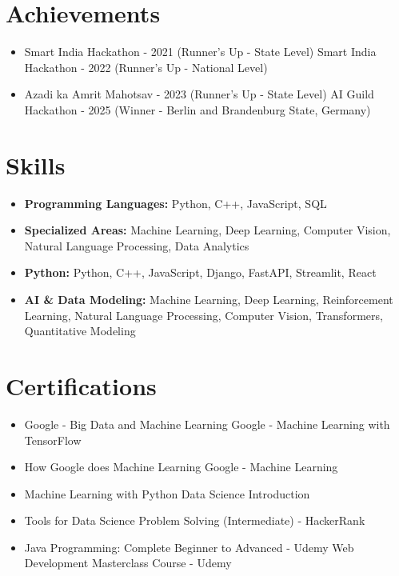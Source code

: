 \documentclass[a4paper,10pt]{article}
\begin{document}
\section*{Achievements}
\begin{itemize}
\item Smart India Hackathon - 2021 (Runner's Up - State Level) \hfill Smart India Hackathon - 2022 (Runner's Up - National Level)
\item Azadi ka Amrit Mahotsav - 2023 (Runner's Up - State Level) \hfill AI Guild Hackathon - 2025 (Winner - Berlin and Brandenburg State, Germany)
\end{itemize}

\section*{Skills}
\begin{itemize}
  \item \textbf{Programming Languages:} Python, C++, JavaScript, SQL
  \item \textbf{Specialized Areas:} Machine Learning, Deep Learning, Computer Vision, Natural Language Processing, Data Analytics
  \item \textbf{Python:} Python, C++, JavaScript, Django, FastAPI, Streamlit, React
  \item \textbf{AI \& Data Modeling:} Machine Learning, Deep Learning, Reinforcement Learning, Natural Language Processing, Computer Vision, Transformers, Quantitative Modeling
\end{itemize}

\section*{Certifications}
\begin{itemize}
\item Google - Big Data and Machine Learning \hfill Google - Machine Learning with TensorFlow
\item How Google does Machine Learning \hfill Google - Machine Learning
\item Machine Learning with Python \hfill Data Science Introduction
\item Tools for Data Science \hfill Problem Solving (Intermediate) - HackerRank
\item Java Programming: Complete Beginner to Advanced - Udemy \hfill Web Development Masterclass Course - Udemy
\end{itemize}
\end{document}
